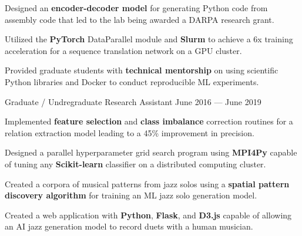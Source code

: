 \begin{cventries}
{\begin{cvitems}
        \item Designed an \textbf{encoder-decoder model} for generating Python  code from assembly code that led to the lab being awarded a DARPA research grant.
        \item Utilized the \textbf{PyTorch} DataParallel module and \textbf{Slurm} to achieve a 6x training acceleration for a sequence translation network on a GPU cluster.
        \item Provided graduate students with \textbf{technical mentorship} on using scientific Python libraries and Docker to conduct reproducible ML experiments.
      \end{cvitems}
    }
    \vspace{.07cm}
  \cventry
    {Graduate / Undregraduate Research Assistant} %
    {} %
    {} %
    {June 2016 --- June 2019} %
    {
      \vspace{-0.1cm}
      \begin{cvitems} %
        \item Implemented \textbf{feature selection} and \textbf{class imbalance} correction routines for a relation extraction model leading to a 45\% improvement in precision.
        \item Designed a parallel hyperparameter grid search program using \textbf{MPI4Py} capable of tuning any \textbf{Scikit-learn} classifier on a distributed computing cluster.
        \item Created a corpora of musical patterns from jazz solos using a \textbf{spatial pattern discovery algorithm} for training an ML jazz solo generation model.
        \item Created a web application with \textbf{Python}, \textbf{Flask}, and \textbf{D3.js} capable of allowing an AI jazz generation model to record duets with a human musician.

\end{cvitems}}
\end{cventries}
